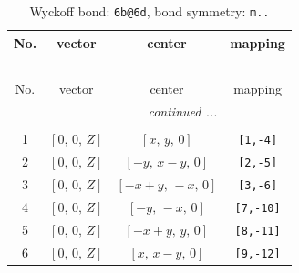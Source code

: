 \documentclass[fleqn,8pt]{jsarticle}
\begin{document}
\begin{longtable}{cccc}
\caption{Wyckoff bond: {\tt 6b@6d}, bond symmetry: {\tt m..}}
 \\
 \hline \hline
No. & vector & center & mapping \\ \hline \endfirsthead

\multicolumn{3}{l}{\tablename\ \thetable{}} \\
 \hline \hline
No. & vector & center & mapping \\ \hline \endhead

 \hline \hline
\multicolumn{3}{r}{\footnotesize\it continued ...} \\ \endfoot

 \hline \hline
\multicolumn{3}{r}{} \\ \endlastfoot

1 & $\left[ 0,\, 0,\, Z \right]$ & $\left[ x,\, y,\, 0 \right]$ & {\tt [1,-4]} \\ \hline
2 & $\left[ 0,\, 0,\, Z \right]$ & $\left[ - y,\, x - y,\, 0 \right]$ & {\tt [2,-5]} \\ \hline
3 & $\left[ 0,\, 0,\, Z \right]$ & $\left[ - x + y,\, - x,\, 0 \right]$ & {\tt [3,-6]} \\ \hline
4 & $\left[ 0,\, 0,\, Z \right]$ & $\left[ - y,\, - x,\, 0 \right]$ & {\tt [7,-10]} \\ \hline
5 & $\left[ 0,\, 0,\, Z \right]$ & $\left[ - x + y,\, y,\, 0 \right]$ & {\tt [8,-11]} \\ \hline
6 & $\left[ 0,\, 0,\, Z \right]$ & $\left[ x,\, x - y,\, 0 \right]$ & {\tt [9,-12]} \\
\end{longtable}
\renewcommand{\arraystretch}{1.2}
\end{document}

